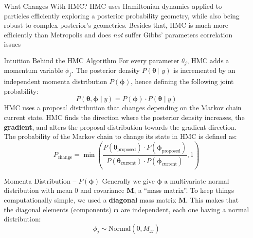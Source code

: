 \begin{frame}{What Changes With HMC?}
	HMC uses Hamiltonian dynamics applied to particles efficiently exploring
	a posterior probability geometry,
	while also being robust to complex posterior's geometries.
	\vfill
	Besides that, HMC is much more efficiently than Metropolis and
	does \textit{not} suffer Gibbs' parameters correlation issues
\end{frame}

\begin{frame}{Intuition Behind the HMC Algorithm}
	\small
	For every parameter $\theta_j$, HMC adds a momentum variable $\phi_j$.
	The posterior density $P(\boldsymbol{\theta} \mid y)$ is incremented by an
	independent momenta distribution $P(\boldsymbol{\phi})$,
	hence defining the following joint probability:
	$$
		P(\boldsymbol{\theta}, \boldsymbol{\phi} \mid y) = P(\boldsymbol{\phi}) \cdot P(\boldsymbol{\theta} \mid y)
	$$
	\small
	HMC uses a proposal distribution that changes depending on the Markov chain current state.
	HMC finds the direction where the posterior density increases,
	the \textbf{gradient},
	and alters the proposal distribution towards the gradient direction.
	\vfill
	The probability of the Markov chain to change its state in HMC is defined as:
	$$
		P_{\text{change}} = \min\left({\frac{P(\boldsymbol{\theta}_{\text{proposed}}) \cdot P(\boldsymbol{\phi}_{\text{proposed}})}{P(\boldsymbol{\theta}_{\text{current}})\cdot P(\boldsymbol{\phi}_{\text{current}})}}, 1\right)
	$$
\end{frame}

\begin{frame}{Momenta Distribution -- $P(\boldsymbol{\phi})$}
	Generally we give $\boldsymbol{\phi}$ a multivariate normal distribution
	with mean $0$ and covariance $\mathbf{M}$,
	a ``mass matrix''.
	\vfill
	To keep things computationally simple,
	we used a \textbf{diagonal} mass matrix $\mathbf{M}$.
	This makes that the diagonal elements (components) $\boldsymbol{\phi}$ are independent,
	each one having a normal distribution:
	$$\phi_j \sim \text{Normal}(0, M_{jj})$$
\end{frame}

